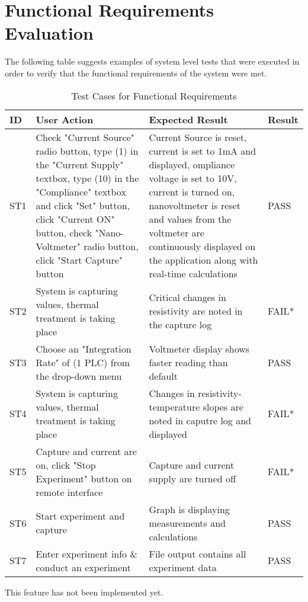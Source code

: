 \documentclass[12pt, titlepage]{article}
\begin{document}

\section{Functional Requirements Evaluation}

\noindent The following table suggests examples of system level tests that were executed in order to verify that the functional requirements of the system were met.


\begin{table}[H]
	\centering
	\caption{Test Cases for Functional Requirements}
	\label{my-label}
	\begin{tabular}{|p{0.85cm}|p{5cm}|p{5cm}|p{1.3cm}|}
		\hline
		\textbf{ID} & \textbf{User Action} & \textbf{Expected Result}  & \textbf{Result} \\ \hline
		ST1 & Check "Current Source" radio button, type (1) in the "Current Supply" textbox, type (10) in the "Compliance" textbox and click "Set" button, click "Current ON" button, check "Nano-Voltmeter" radio button, click "Start Capture" button & Current Source is reset, current  is set to 1mA and displayed, ompliance voltage is set to 10V, current is turned on, nanovoltmeter is reset and values from the voltmeter are continuously displayed on the application along with real-time calculations & PASS\\ \hline
		ST2 & System is capturing values, thermal treatment is taking place & Critical changes in resistivity are noted in the capture log & FAIL*\\ \hline
		ST3 & Choose an "Integration Rate" of (1 PLC) from the drop-down menu & Voltmeter display shows faster reading than default & PASS\\ \hline
		ST4 & System is capturing values, thermal treatment is taking place & Changes in resistivity-temperature slopes are noted in caputre log and displayed & FAIL*\\ \hline
		ST5 & Capture and current are on, click "Stop Experiment" button on remote interface & Capture and current supply are turned off & FAIL* \\ \hline
		ST6 & Start experiment and capture & Graph is displaying measurements and calculations & PASS \\ \hline
		ST7 & Enter experiment info \& conduct an experiment & File output contains all experiment data & PASS \\ \hline
	\end{tabular}
\end{table}
\noindent * This feature has not been implemented yet.
\end{document}
